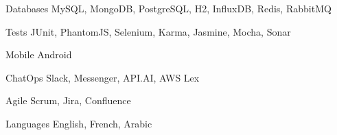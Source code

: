 \begin{cvskills}
\cvskill
{Databases} %
{MySQL, MongoDB, PostgreSQL, H2, InfluxDB, Redis, RabbitMQ} %

\cvskill
{Tests} %
{JUnit, PhantomJS, Selenium, Karma, Jasmine, Mocha, Sonar} %

\cvskill
{Mobile} %
{Android} %

\cvskill
{ChatOps} %
{Slack, Messenger, API.AI, AWS Lex} %

\cvskill
{Agile} %
{Scrum, Jira, Confluence} %


\cvskill
{Languages} %
{English, French, Arabic} %


\end{cvskills}
